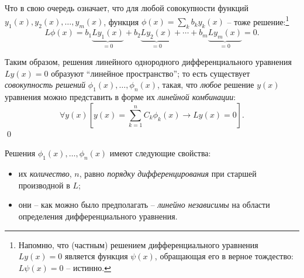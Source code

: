 \documentclass[12pt]{report}
\begin{document}
Что в свою очередь означает, что для любой совокупности функций $y_1(x), y_2(x), \dots, y_m(x)$, функция $\phi(x) = \sum_k b_ky_k(x)$ -- тоже решение:\footnote{Напомню, что (частным) решением дифференциального уравнения $Ly(x)=0$ является функция $\psi(x)$, обращающая его в верное тождество: $L\psi(x) = 0$ -- истинно.}
\[
L\phi(x) = b_1\underbrace{Ly_1(x)}_{=0} + b_2\underbrace{Ly_2(x)}_{=0} + \cdots + b_m\underbrace{Ly_m(x)}_{=0} = 0.
\]

\begin{defn}\label{def:FSS}	
	Таким образом, решения линейного однородного дифференциального уравнения ${Ly(x) = 0}$  образуют ``линейное пространство''; то есть существует \emph{совокупность решений} $\phi_1(x), \dots, \phi_n(x)$, такая, что \emph{любое} решение $y(x)$ уравнения можно представить в форме их \emph{линейной комбинации}:
	\[
	\forall y(x) \left[y(x) = \sum_{k=1}^{n} C_k\phi_k(x) \rightarrow Ly(x) = 0\right]. 
	\]\qed
\end{defn}

Решения $\phi_1(x), \dots, \phi_n(x)$ имеют следующие свойства:
\begin{itemize}
	\item их \emph{количество}, $n$, равно \emph{порядку дифференцирования} при старшей производной в $L$;
	\item они -- как можно было предполагать -- \emph{линейно независимы} на области определения дифференциального уравнения.
\end{itemize}
\end{document}
